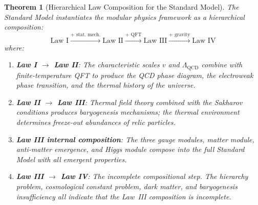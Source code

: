 \documentclass[12pt]{article}
\newtheorem{theorem}{Theorem}[section]
\theoremstyle{definition}
\theoremstyle{remark}
\begin{document}
\begin{theorem}[Hierarchical Law Composition for the Standard Model]
\label{thm:hierarchical-law}
The Standard Model instantiates the modular physics framework as a hierarchical composition:
\begin{equation}
\text{Law I} \xrightarrow{\text{+ stat.\ mech.}} \text{Law II} \xrightarrow{\text{+ QFT}} \text{Law III} \xrightarrow{\text{+ gravity}} \text{Law IV}
\end{equation}
where:
\begin{enumerate}
\item \textbf{Law I $\to$ Law II}: The characteristic scales $v$ and $\Lambda_{\mathrm{QCD}}$ combine with finite-temperature QFT to produce the QCD phase diagram, the electroweak phase transition, and the thermal history of the universe.
\item \textbf{Law II $\to$ Law III}: Thermal field theory combined with the Sakharov conditions produces baryogenesis mechanisms; the thermal environment determines freeze-out abundances of relic particles.
\item \textbf{Law III internal composition}: The three gauge modules, matter module, anti-matter emergence, and Higgs module compose into the full Standard Model with all emergent properties.
\item \textbf{Law III $\to$ Law IV}: The incomplete compositional step. The hierarchy problem, cosmological constant problem, dark matter, and baryogenesis insufficiency all indicate that the Law~III composition is incomplete.
\end{enumerate}
\end{theorem}
\end{document}
